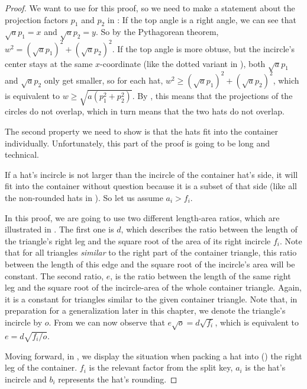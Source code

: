 \documentclass[a4paper,style=print,bibliography=totoc,nexus,lnum,extramargin]{tubsbook}
\begin{document}
\begin{proof}
    We want to use  for this proof, so we need to make a statement about the projection factors $p_1$ and $p_2$ in : If the top angle is a right angle, we can see that $\sqrt{a}p_1 = x$ and $\sqrt{a}p_2 = y$. So by the Pythagorean theorem, $w^2 = (\sqrt{a}p_1)^2 + (\sqrt{a}p_2)^2$.
     If the top angle is more obtuse, but the incircle's center stays at the same $x$-coordinate (like the dotted variant in ),
    both $\sqrt{a}p_1$ and $\sqrt{a}p_2$ only get smaller, so for each hat, $w^2 \ge (\sqrt{a}p_1)^2 + (\sqrt{a}p_2)^2$, which is equivalent to $w \ge \sqrt{a(p_1^2+p_2^2)}$.
    By , this means that the projections of the circles do not overlap, which in turn means that the two hats do not overlap.


    The second property we need to show is that the hats fit into the container individually. Unfortunately, this part of the proof is going to be long and technical.

    If a hat's incircle is not larger than the incircle of the container hat's side, it will fit into the container without question because it is a subset of that side (like all the non-rounded hats in ).
    So let us assume $a_i > f_i$.

    In this proof, we are going to use two different length-area ratios, which are illustrated in . The first one is $d$, which describes the ratio between the length of the triangle's right leg and the square root of the area of its right incircle $f_i$. Note that for all triangles \emph{similar} to the right part of the container triangle, this ratio between the length of this edge and the square root of the incircle's area will be constant.
    The second ratio, $e$, is the ratio between the length of the same right leg and the square root of the incircle-area of the whole container triangle. Again, it is a constant for triangles similar to the given container triangle. Note that, in preparation for a generalization later in this chapter, we denote the triangle's incircle by $o$.
    From  we can now observe that
    $e\sqrt{o} = d\sqrt{f_i}$, which is equivalent to $e = d\sqrt{f_i/o}$.



    Moving forward, in , we display the situation when packing a hat into (\wlofg) the right leg of the container. $f_i$ is the relevant factor from the split key, $a_i$ is the hat's incircle and $b_i$ represents the hat's rounding.


\end{proof}
\end{document}
